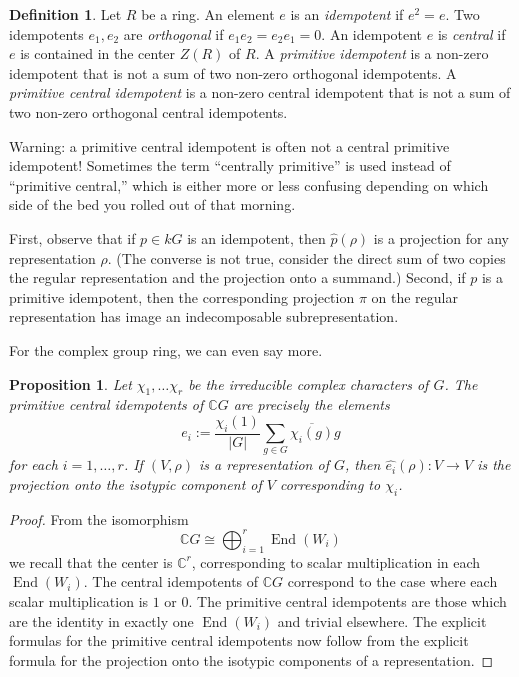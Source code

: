 \documentclass[12pt]{article}
\theoremstyle{plain}
\newtheorem{proposition}[theorem]{Proposition}
\theoremstyle{definition}
\newtheorem{definition}[theorem]{Definition}
\theoremstyle{remark}
\numberwithin{equation}{section}
\begin{document}
\begin{definition}
Let $R$ be a ring.  An element $e$ is an \emph{idempotent} if $e^2=e$.
Two idempotents $e_1,e_2$ are \emph{orthogonal} if $e_1e_2=e_2e_1=0$.
An idempotent $e$ is \emph{central} if $e$ is contained in the center
$Z(R)$ of $R$.
A \emph{primitive idempotent} is a non-zero idempotent
that is not a sum of two non-zero orthogonal idempotents.
A \emph{primitive central idempotent} is a non-zero central idempotent
that is not a sum of two non-zero orthogonal central idempotents.
\end{definition}

Warning: a primitive central idempotent is often not a central primitive
idempotent!  Sometimes the term ``centrally primitive'' is used
instead of ``primitive central,'' which is either more or less confusing
depending on which side of the bed you rolled out of that morning.

First, observe that if $p \in kG$ is an idempotent,
then $\widehat{p}(\rho)$ is a projection for any representation $\rho$.
(The converse is not true, consider the direct sum of two copies the regular
representation and the projection onto a summand.)
Second, if $p$ is a primitive idempotent, then the corresponding
projection $\pi$ on the regular representation has image an
indecomposable subrepresentation.

For the complex group ring, we can even say more.

\begin{proposition}
Let $\chi_1,\ldots \chi_r$ be the irreducible complex characters of $G$.
The primitive central idempotents of $\mathbb{C}G$ are precisely
the elements
\[
e_i := \frac{\chi_i(1)}{|G|} \sum_{g\in G} \overline{\chi_i(g)} g
\]
for each $i=1,\ldots,r$.
If $(V,\rho)$ is a representation of $G$, then
$\widehat{e_i}(\rho) : V \to V$ is the projection onto the isotypic
component of $V$ corresponding to $\chi_i$.
\end{proposition}

\begin{proof}
From the isomorphism
\[
\mathbb{C}G \cong \bigoplus_{i=1}^r \operatorname{End}(W_i)
\]
we recall that the center is $\mathbb{C}^r$,
corresponding to scalar multiplication in each
$\operatorname{End}(W_i)$.
The central idempotents of $\mathbb{C}G$
correspond to the case where each scalar multiplication is $1$ or $0$.
The primitive central idempotents are those which are the identity
in exactly one $\operatorname{End}(W_i)$ and trivial elsewhere.
The explicit formulas for the primitive central idempotents now follow
from the explicit formula for the projection onto the isotypic
components of a representation. 
\end{proof}
\end{document}
